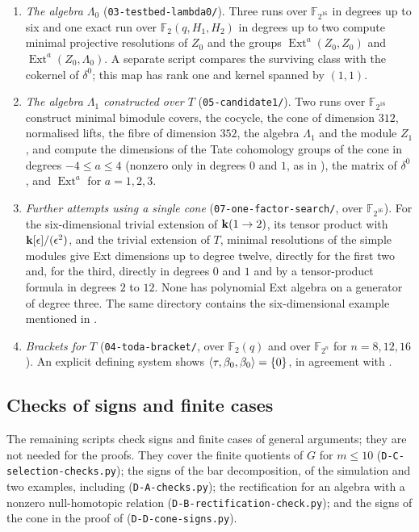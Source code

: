 \begin{enumerate}
  \item \emph{The algebra $\Lambda_0$} (\texttt{03-testbed-lambda0/}). Three
    runs over $\mathbb{F}_{2^{16}}$ in degrees up to six and one exact run over
    $\mathbb{F}_2(q,H_1,H_2)$ in degrees up to two compute minimal projective
    resolutions of $Z_0$ and the groups $\operatorname{Ext}^a(Z_0,Z_0)$ and
    $\operatorname{Ext}^a(Z_0,\Lambda_0)$. A separate script compares the
    surviving class with the cokernel of $\delta^0$; this map has rank one and
    kernel spanned by $(1,1)$.
  \item \emph{The algebra $\Lambda_1$ constructed over $T$}
  (\texttt{05-candidate1/}).
    Two runs over $\mathbb{F}_{2^{16}}$ construct minimal bimodule covers, the
    cocycle, the cone of dimension $312$, normalised lifts, the fibre of
    dimension $352$, the algebra $\Lambda_1$ and the module $Z_1$, and compute
    the dimensions of the Tate cohomology groups of the cone in degrees ${-4\leq
    a\leq4}$ (nonzero only in degrees
    $0$ and $1$, as in ), the matrix of $\delta^0$, and
    $\operatorname{Ext}^a$ for ${a=1,2,3}$.
  \item \emph{Further attempts using a single cone}
  (\texttt{07-one-factor-search/},
    over $\mathbb{F}_{2^{16}}$). For the six-dimensional trivial extension of
    ${\mathbf{k}(1\to2)}$, its tensor product with $\mathbf{k}[\epsilon]/(\epsilon^2)$, and the
    trivial extension of $T$, minimal resolutions of the simple modules give
    Ext dimensions up to degree twelve, directly for the first two and, for
    the third, directly in degrees $0$ and $1$ and by a tensor-product formula
    in degrees $2$ to $12$. None has polynomial Ext algebra on a generator of
    degree three. The same directory contains the six-dimensional example
    mentioned in .
  \item \emph{Brackets for $T$} (\texttt{04-toda-bracket/}, over
    $\mathbb{F}_2(q)$ and over $\mathbb{F}_{2^n}$ for ${n}={8,12,16}$). An explicit
    defining system shows ${\langle\tau,\beta_0,\beta_0\rangle}={\set{0}}$, in
    agreement with .
\end{enumerate}

\subsection*{Checks of signs and finite cases}

The remaining scripts check signs and finite cases of general arguments; they
are not needed for the proofs. They cover the finite quotients of $G$ for
${m\leq10}$
(\texttt{D-C-selection-checks.py}); the signs of the bar decomposition, of the
simulation and two examples, including
 (\texttt{D-A-checks.py}); the rectification for an
algebra with a nonzero null-homotopic relation
(\texttt{D-B-rectification-check.py});
and the signs of the cone in the proof of 
(\texttt{D-D-cone-signs.py}).
